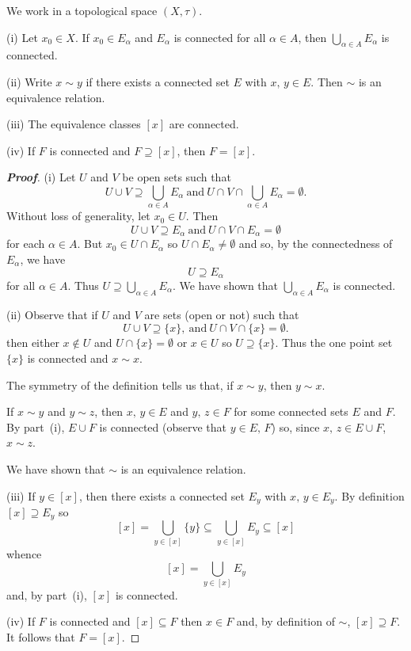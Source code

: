 \begin{lemma}\label{L;connected components}
We work in a topological space $(X,\tau)$.

(i) Let $x_{0}\in X$. If $x_{0}\in E_{\alpha}$
and $E_{\alpha}$ is connected for all $\alpha\in A$,
then $\bigcup_{\alpha\in A}E_{\alpha}$ is connected.

(ii) Write $x\sim y$ if there exists a connected set $E$
with $x,\,y\in E$. Then $\sim$ is an equivalence relation.

(iii) The equivalence classes $[x]$ are connected.

(iv) If $F$ is connected and $F\supseteq [x]$, then $F=[x]$.
\end{lemma}
\begin{proof}[\bf Proof] (i) Let $U$ and $V$ be open sets such that
\[U\cup V\supseteq \bigcup_{\alpha\in A}E_{\alpha}
\ \text{and}
\ U\cap V\cap \bigcup_{\alpha\in A}E_{\alpha}=\emptyset.\]
Without loss of generality, let $x_{0}\in U$.
Then
\[U\cup V\supseteq E_{\alpha}
\ \text{and}
\ U\cap V\cap E_{\alpha}=\emptyset\]
for each $\alpha\in A$. But
$x_{0}\in U\cap E_{\alpha}$ so
$U\cap E_{\alpha}\neq\emptyset$ and so, by the
connectedness of $E_{\alpha}$, we have
\[U\supseteq E_{\alpha}\]
for all $\alpha\in A$. Thus
$U\supseteq \bigcup_{\alpha\in A}E_{\alpha}$.
We have shown that $\bigcup_{\alpha\in A}E_{\alpha}$ is connected.

(ii) Observe that if $U$ and $V$ are sets (open or not) such that
\[U\cup V\supseteq \{x\},
\ \text{and}
\ U\cap V\cap \{x\}=\emptyset.\]
then either $x\notin U$ and $U\cap\{x\}=\emptyset$
or $x\in U$ so $U\supseteq\{x\}$. Thus the one point set
$\{x\}$ is connected and $x\sim x$.

The symmetry of the definition tells us that,
if $x\sim y$, then $y\sim x$.

If $x\sim y$ and $y\sim z$, then $x,\,y\in E$ and $y,\,z\in F$
for some connected sets $E$ and $F$. By part~(i),
$E\cup F$ is connected (observe that $y\in E,\,F$)
so, since $x,\,z\in E\cup F$, $x\sim z$.

We have shown that $\sim$ is an equivalence relation.

(iii) If $y\in [x]$, then there exists a connected set $E_{y}$
with $x,\,y\in E_{y}$. By definition $[x]\supseteq E_{y}$ so
\[[x]=\bigcup_{y\in[x]}\{y\}\subseteq \bigcup_{y\in[x]}E_{y}\subseteq [x]\]
whence
\[[x]=\bigcup_{y\in[x]}E_{y}\]
and, by part~(i), $[x]$ is connected.

(iv) If $F$ is connected and $[x]\subseteq F$ then $x\in F$
and, by definition of $\sim$, $[x]\supseteq F$.
It follows that $F=[x]$.
\end{proof}


